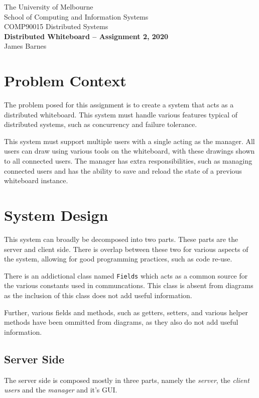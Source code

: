 \documentclass[12pt]{article}
\begin{document}
\begin{center}
  {\sc The University of Melbourne \\
  School of Computing and Information Systems \\ 
  COMP90015 Distributed Systems}
  \bigskip \\
  {\Large\bf Distributed Whiteboard -- Assignment 2, 2020}
  \bigskip \\
  {\large James Barnes}
\end{center}

\section{Problem Context}
The problem posed for this assignment is to create a system that acts as a distributed whiteboard. This system must handle various features typical of distributed systems, such as concurrency and failure tolerance.

This system must support multiple users with a single acting as the manager. All users can draw using various tools on the whiteboard, with these drawings shown to all connected users. The manager has extra responsibilities, such as managing connected users and has the ability to save and reload the state of a previous whiteboard instance.

\section{System Design}
This system can broadly be decomposed into two parts. These parts are the server and client side. There is overlap between these two for various aspects of the system, allowing for good programming practices, such as code re-use.

There is an addictional class named \texttt{Fields} which acts as a common source for the various constants used in communcations. This class is absent from diagrams as the inclusion of this class does not add useful information.

Further, various fields and methods, such as getters, setters, and various helper methods have been ommitted from diagrams, as they also do not add useful information.

\subsection{Server Side}
The server side is composed mostly in three parts, namely the \textit{server}, the \textit{client users} and the \textit{manager} and it's GUI.
\end{document}
